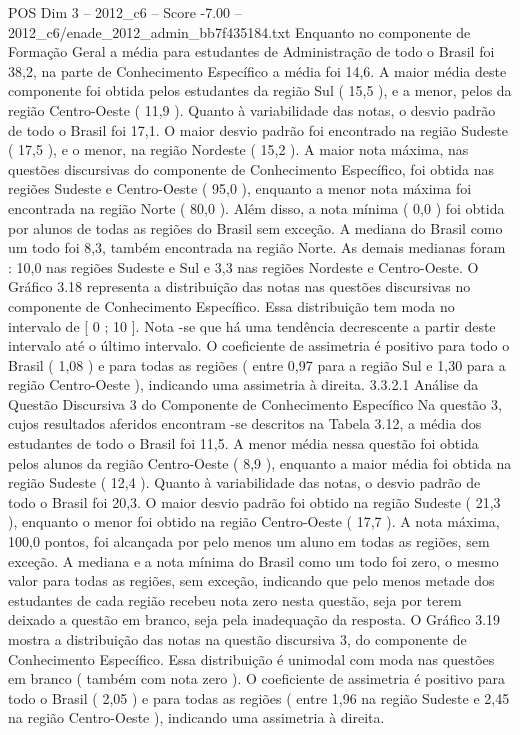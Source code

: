 \begin{textsample}{POS Dim 3 – 2012\_c6 – Score -7.00 – 2012\_c6/enade\_2012\_admin\_bb7f435184.txt}
Enquanto no componente de Formação Geral a média para estudantes de Administração de todo o Brasil foi 38,2, na parte de Conhecimento Específico a média foi 14,6.
A maior média deste componente foi obtida pelos estudantes da região Sul ( 15,5 ), e a menor, pelos da região Centro-Oeste ( 11,9 ).
Quanto à variabilidade das notas, o desvio padrão de todo o Brasil foi 17,1.
O maior desvio padrão foi encontrado na região Sudeste ( 17,5 ), e o menor, na região Nordeste ( 15,2 ).
A maior nota máxima, nas questões discursivas do componente de Conhecimento Específico, foi obtida nas regiões Sudeste e Centro-Oeste ( 95,0 ), enquanto a menor nota máxima foi encontrada na região Norte ( 80,0 ).
Além disso, a nota mínima ( 0,0 ) foi obtida por alunos de todas as regiões do Brasil sem exceção.
A mediana do Brasil como um todo foi 8,3, também encontrada na região Norte.
As demais medianas foram : 10,0 nas regiões Sudeste e Sul e 3,3 nas regiões Nordeste e Centro-Oeste.
O Gráfico 3.18 representa a distribuição das notas nas questões discursivas no componente de Conhecimento Específico.
Essa distribuição tem moda no intervalo de [ 0 ; 10 ].
Nota -se que há uma tendência decrescente a partir deste intervalo até o último intervalo.
O coeficiente de assimetria é positivo para todo o Brasil ( 1,08 ) e para todas as regiões ( entre 0,97 para a região Sul e 1,30 para a região Centro-Oeste ), indicando uma assimetria à direita. 3.3.2.1 Análise da Questão Discursiva 3 do Componente de Conhecimento Específico Na questão 3, cujos resultados aferidos encontram -se descritos na Tabela 3.12, a média dos estudantes de todo o Brasil foi 11,5.
A menor média nessa questão foi obtida pelos alunos da região Centro-Oeste ( 8,9 ), enquanto a maior média foi obtida na região Sudeste ( 12,4 ).
Quanto à variabilidade das notas, o desvio padrão de todo o Brasil foi 20,3.
O maior desvio padrão foi obtido na região Sudeste ( 21,3 ), enquanto o menor foi obtido na região Centro-Oeste ( 17,7 ).
A nota máxima, 100,0 pontos, foi alcançada por pelo menos um aluno em todas as regiões, sem exceção.
A mediana e a nota mínima do Brasil como um todo foi zero, o mesmo valor para todas as regiões, sem exceção, indicando que pelo menos metade dos estudantes de cada região recebeu nota zero nesta questão, seja por terem deixado a questão em branco, seja pela inadequação da resposta.
O Gráfico 3.19 mostra a distribuição das notas na questão discursiva 3, do componente de Conhecimento Específico.
Essa distribuição é unimodal com moda nas questões em branco ( também com nota zero ).
O coeficiente de assimetria é positivo para todo o Brasil ( 2,05 ) e para todas as regiões ( entre 1,96 na região Sudeste e 2,45 na região Centro-Oeste ), indicando uma assimetria à direita.

\end{textsample}
